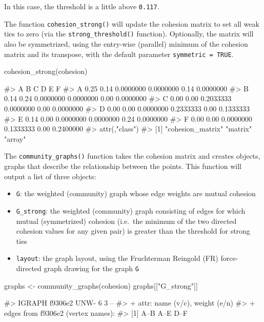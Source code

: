 In this case, the threshold is a little above \texttt{0.117}.

The function \texttt{cohesion\_strong()} will update the cohesion matrix
to set all weak ties to zero (via the \texttt{strong\_threshold()}
function). Optionally, the matrix will also be symmetrized, using the
entry-wise (parallel) minimum of the cohesion matrix and its transpose,
with the default parameter \texttt{symmetric\ =\ TRUE}.

\begin{Schunk}
\begin{Sinput}
cohesion_strong(cohesion)
\end{Sinput}
\begin{Soutput}
#>      A    B         C         D    E         F
#> A 0.25 0.14 0.0000000 0.0000000 0.14 0.0000000
#> B 0.14 0.24 0.0000000 0.0000000 0.00 0.0000000
#> C 0.00 0.00 0.2033333 0.0000000 0.00 0.0000000
#> D 0.00 0.00 0.0000000 0.2333333 0.00 0.1333333
#> E 0.14 0.00 0.0000000 0.0000000 0.24 0.0000000
#> F 0.00 0.00 0.0000000 0.1333333 0.00 0.2400000
#> attr(,"class")
#> [1] "cohesion_matrix" "matrix"          "array"
\end{Soutput}
\end{Schunk}

The \texttt{community\_graphs()} function takes the cohesion matrix and
creates  objects, graphs that describe the relationship
between the points. This function will output a list of three objects:

\begin{itemize}
\tightlist
\item
  \texttt{G}: the weighted (community) graph whose edge weights are
  mutual cohesion
\item
  \texttt{G\_strong}: the weighted (community) graph consisting of edges
  for which mutual (symmetrized) cohesion (i.e.~the minimum of the two
  directed cohesion values for any given pair) is greater than the
  threshold for strong ties
\item
  \texttt{layout}: the graph layout, using the Fruchterman Reingold (FR)
  force-directed graph drawing for the graph \texttt{G}
\end{itemize}

\begin{Schunk}
\begin{Sinput}
graphs <- community_graphs(cohesion)
graphs[["G_strong"]]
\end{Sinput}
\begin{Soutput}
#> IGRAPH f9306e2 UNW- 6 3 -- 
#> + attr: name (v/c), weight (e/n)
#> + edges from f9306e2 (vertex names):
#> [1] A--B A--E D--F
\end{Soutput}
\end{Schunk}

